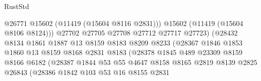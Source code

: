 \begin{lexlean}{RustStd}
\begin{coremodule}
                                          @26771
                                          @15602
                                          (@11419 (@15604 @8116 @2831)))
                                        @15602
                                        (@11419 (@15604 @8106 @8124)))
                                      @27702
                                      @27705
                                      @27708
                                      @27712
                                      @27717
                                      @27723)
                                    (@28432
                                      @8134
                                      @1861
                                      @1887
                                      @13
                                      @8159
                                      @8183
                                      @8209
                                      @8233
                                      (@28367
                                        @1846
                                        @1853
                                        @1860
                                        @13
                                        @8159
                                        @8168
                                        @2831
                                        @8183
                                        (@28378
                                          @1845
                                          @489
                                          @23309
                                          @8159
                                          @8166
                                          @6182
                                          (@28387
                                            @1844
                                            @53
                                            @55
                                            @4647
                                            @8158
                                            @8165
                                            @2819
                                            @8139
                                            @2825
                                            @26843
                                            (@28386
                                              @1842
                                              @103
                                              @53
                                              @16
                                              @8155
                                              @2831

\end{coremodule}
\end{lexlean}
